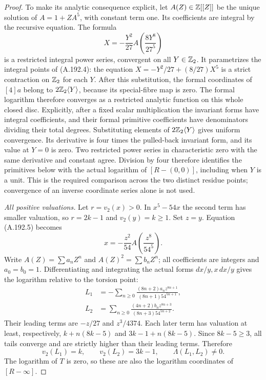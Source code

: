 \begin{proof}
To make its analytic consequence explicit, let
\(A(Z)\in\mathbb Z[[Z]]\) be the unique solution of
\(A=1+ZA^5\), with constant term one.  Its coefficients
are integral by the recursive equation.  The formula
\[
        X=-\frac{Y^2}{27}
                    A\left(\frac{8Y^8}{27^5}\right)
\tag{A.192.5}
\]
is a restricted integral power series, convergent on
all \(Y\in\mathbb Z_2\).  It parametrizes the integral
points of (A.192.4): the equation
\(X=-Y^2/27+(8/27)X^5\) is a strict contraction
on \(\mathbb Z_2\) for each \(Y\).
After this substitution, the formal coordinates of
\([4]a\) belong to \(2\mathbb Z_2\langle Y\rangle\),
because its special-fibre map is zero.  The formal
logarithm therefore converges as a restricted analytic
function on this whole closed disc.  Explicitly,
after a fixed scalar multiplication the invariant
forms have integral coefficients, and their formal
primitive coefficients have denominators dividing
their total degrees.  Substituting elements of
\(2\mathbb Z_2\langle Y\rangle\) gives uniform convergence.
Its derivative is four times the pulled-back invariant
form, and its value at \(Y=0\) is zero.  Two restricted
power series in characteristic zero with the same
derivative and constant agree.  Division by four
therefore identifies the primitives below with the
actual logarithm of \([R-(0,0)]\), including when
\(Y\) is a unit.  This is the required comparison
across the two distinct residue points; convergence
of an inverse coordinate series alone is not used.

\emph{All positive valuations.}
Let \(r=v_2(x)>0\).  In \(x^5-54x\) the second
term has smaller valuation, so \(r=2k-1\) and
\(v_2(y)=k\geq1\).  Set \(z=y\).  Equation
(A.192.5) becomes
\[
       x=-\frac{z^2}{54}
                       A\left(\frac{z^8}{54^5}\right).
\tag{A.192.6}
\]
Write \(A(Z)=\sum a_nZ^n\) and
\(A(Z)^2=\sum b_nZ^n\); all coefficients are
integers and \(a_0=b_0=1\).  Differentiating and
integrating the actual forms \(dx/y,x\,dx/y\)
gives the logarithm relative to the torsion point:
\[
\begin{aligned}
 L_1&=-\sum_{n\geq0}
       \frac{(8n+2)a_nz^{8n+1}}
                 {(8n+1)54^{5n+1}},\\
 L_2&=\sum_{n\geq0}
       \frac{(4n+2)b_nz^{8n+3}}
                 {(8n+3)54^{5n+2}}.
\end{aligned}
\tag{A.192.7}
\]
Their leading terms are \(-z/27\) and
\(z^3/4374\).  Each later term has valuation
at least, respectively,
\(k+n(8k-5)\) and
\(3k-1+n(8k-5)\).
Since \(8k-5\geq3\), all tails converge and are
strictly higher than their leading terms.  Therefore
\[
                  v_2(L_1)=k,\qquad v_2(L_2)=3k-1,
                  \qquad\Lambda(L_1,L_2)\ne0.
\tag{A.192.8}
\]
The logarithm of \(T\) is zero, so these are also
the logarithm coordinates of \([R-\infty]\).


\end{proof}
